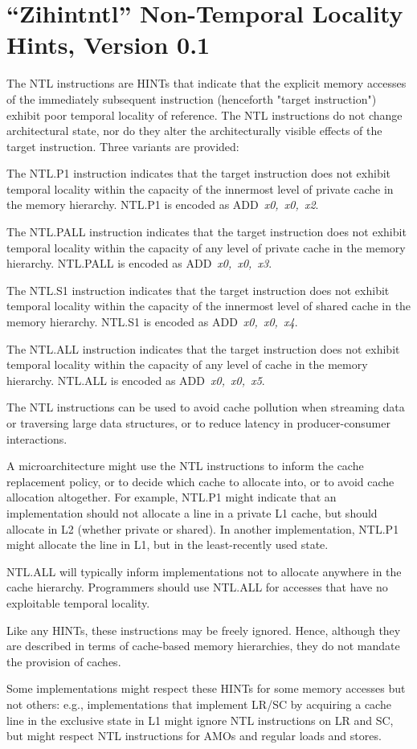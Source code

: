 \chapter{``Zihintntl'' Non-Temporal Locality Hints, Version 0.1}
\label{chap:zihintpause}

The NTL instructions are HINTs that indicate that the explicit memory accesses of the immediately subsequent
instruction (henceforth "target instruction") exhibit poor temporal locality of reference.
The NTL instructions do not change architectural state, nor do they alter the
architecturally visible effects of the target instruction.
Three variants are provided:

The NTL.P1 instruction indicates that the target instruction
does not exhibit temporal locality within the capacity of the innermost level
of private cache in the memory hierarchy.
NTL.P1 is encoded as \mbox{ADD {\em x0, x0, x2}}.

The NTL.PALL instruction indicates that the target instruction
does not exhibit temporal locality within the capacity of any
level of private cache in the memory hierarchy.
NTL.PALL is encoded as \mbox{ADD {\em x0, x0, x3}}.

The NTL.S1 instruction indicates that the target instruction
does not exhibit temporal locality within the capacity of the innermost level
of shared cache in the memory hierarchy.
NTL.S1 is encoded as \mbox{ADD {\em x0, x0, x4}}.

The NTL.ALL instruction indicates that the target
instruction does not exhibit temporal locality within the capacity of any
level of cache in the memory hierarchy.
NTL.ALL is encoded as \mbox{ADD {\em x0, x0, x5}}.

\begin{commentary}
The NTL instructions can be used to avoid cache pollution when streaming data
or traversing large data structures, or to reduce latency in producer-consumer
interactions.

A microarchitecture might use the NTL instructions to inform the cache
replacement policy, or to decide which cache to allocate into, or to avoid
cache allocation altogether.
For example, NTL.P1 might indicate that an implementation should not allocate
a line in a private L1 cache, but should allocate in L2 (whether private or
shared).
In another implementation, NTL.P1 might allocate the line in L1, but in
the least-recently used state.

NTL.ALL will typically inform implementations not to allocate anywhere in the
cache hierarchy.
Programmers should use NTL.ALL for accesses that have no exploitable temporal
locality.

Like any HINTs, these instructions may be freely ignored.
Hence, although they are described in terms of cache-based memory hierarchies,
they do not mandate the provision of caches.

Some implementations might respect these HINTs for some memory accesses but
not others: e.g., implementations that implement LR/SC by acquiring a
cache line in the exclusive state in L1 might ignore NTL instructions
on LR and SC, but might respect NTL instructions for
AMOs and regular loads and stores.
\end{commentary}

